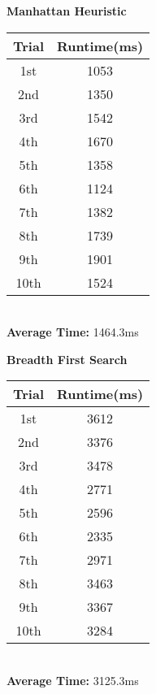 	\begin{center}
	\textbf{Manhattan Heuristic}\\
	\begin{tabular}{ |c|c| } 
	\hline
	Trial & Runtime(ms) \\
	\hline
	\multirow{1}{3em}{1st}
	& 1053 \\
	\hline
	\multirow{1}{3em}{2nd}
	& 1350 \\
	\hline
	\multirow{1}{3em}{3rd}
	& 1542 \\
	\hline
	\multirow{1}{3em}{4th}
	& 1670 \\
	\hline
	\multirow{1}{3em}{5th}
	& 1358 \\
	\hline
	\multirow{1}{3em}{6th}
	& 1124 \\
	\hline
	\multirow{1}{3em}{7th}
	& 1382 \\
	\hline
	\multirow{1}{3em}{8th}
	& 1739 \\
	\hline
	\multirow{1}{3em}{9th}
	& 1901 \\
	\hline
	\multirow{1}{3em}{10th}
	& 1524 \\
	\hline
	\end{tabular} \\
	\textbf{Average Time:} 1464.3ms \\
	\end{center}

	\begin{center}
	\textbf{Breadth First Search}\\
	\begin{tabular}{ |c|c| } 
	\hline
	Trial & Runtime(ms) \\
	\hline
	\multirow{1}{3em}{1st}
	& 3612 \\
	\hline
	\multirow{1}{3em}{2nd}
	& 3376 \\
	\hline
	\multirow{1}{3em}{3rd}
	& 3478 \\
	\hline
	\multirow{1}{3em}{4th}
	& 2771 \\
	\hline
	\multirow{1}{3em}{5th}
	& 2596 \\
	\hline
	\multirow{1}{3em}{6th}
	& 2335 \\
	\hline
	\multirow{1}{3em}{7th}
	& 2971 \\
	\hline
	\multirow{1}{3em}{8th}
	& 3463 \\
	\hline
	\multirow{1}{3em}{9th}
	& 3367 \\
	\hline
	\multirow{1}{3em}{10th}
	& 3284 \\
	\hline
	\end{tabular} \\
	\textbf{Average Time:} 3125.3ms \\
	\end{center}

